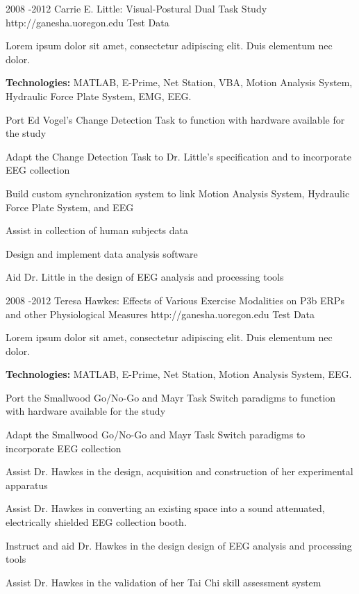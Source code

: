 \documentclass[10pt]{article} %
\begin{document}

\job
{2008 -}{2012}
{Carrie E. Little: Visual-Postural Dual Task Study}
{http://ganesha.uoregon.edu}
{Test Data}
{Lorem ipsum dolor sit amet, consectetur adipiscing elit. Duis elementum nec dolor. \\
\rule{0mm}{5mm}\textbf{Technologies:} MATLAB, E-Prime, Net Station, VBA, Motion Analysis System, Hydraulic Force Plate System, EMG, EEG.}

\begin{itemize-noindent}
\item{Port Ed Vogel's Change Detection Task to function with hardware available for the study}
\item{Adapt the Change Detection Task to Dr. Little's specification and to incorporate EEG collection}
\item{Build custom synchronization system to link Motion Analysis System, Hydraulic Force Plate System, and EEG}
\item{Assist in collection of human subjects data}
\item{Design and implement data analysis software}
\item{Aid Dr. Little in the design of EEG analysis and processing tools}
\end{itemize-noindent}


\job
{2008 -}{2012}
{Teresa Hawkes: Effects of Various Exercise Modalities on P3b ERPs and other Physiological Measures}
{http://ganesha.uoregon.edu}
{Test Data}
{Lorem ipsum dolor sit amet, consectetur adipiscing elit. Duis elementum nec dolor. \\
\rule{0mm}{5mm}\textbf{Technologies:} MATLAB, E-Prime, Net Station, Motion Analysis System, EEG.}

\begin{itemize-noindent}
\item{Port the Smallwood Go/No-Go and Mayr Task Switch paradigms to function with hardware available for the study}
\item{Adapt the Smallwood Go/No-Go and Mayr Task Switch paradigms to incorporate EEG collection}
\item{Assist Dr. Hawkes in the design, acquisition and construction of her experimental apparatus}
\item{Assist Dr. Hawkes in converting an existing space into a sound attenuated, electrically shielded EEG collection booth.}
\item{Instruct and aid Dr. Hawkes in the design design of EEG analysis and processing tools}
\item{Assist Dr. Hawkes in the validation of her Tai Chi skill assessment system}
\end{itemize-noindent}
\end{document}
